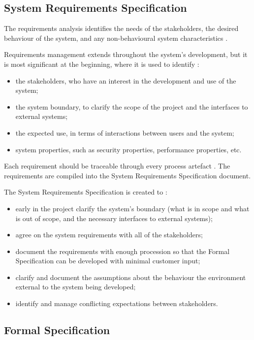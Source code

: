 \subsection{System Requirements Specification}

The requirements analysis identifies the needs of the stakeholders, the desired 
behaviour of the system, and any non-behavioural system characteristics \parencite{Tokeneer}. 

Requirements management extends throughout the system's development, but it is 
most significant at the beginning, where it is used to identify \parencite{Tokeneer}:
\begin{itemize}
	\item the stakeholders, who have an interest in the development and use of the system;
	\item the system boundary, to clarify the scope of the project and the interfaces to external systems;
	\item the expected use, in terms of interactions between users and the system;
	\item system properties, such as security properties, performance properties, etc.
\end{itemize}

Each requirement should be traceable through every process artefact \parencite{Tokeneer}.
The requirements are compiled into the System Requirements Specification document.

The System Requirements Specification is created to \parencite{Tokeneer}:
\begin{itemize}
	\item early in the project clarify the system's boundary (what is in scope 
		and what is out of scope, and the necessary interfaces to external systems);
	\item agree on the system requirements with all of the stakeholders;
	\item document the requirements with enough procession so that the Formal 
		Specification can be developed with minimal customer input;
	\item clarify and document the assumptions about the behaviour the environment
		external to the system being developed;
	\item identify and manage conflicting expectations between stakeholders.
\end{itemize}

\subsection{Formal Specification}

